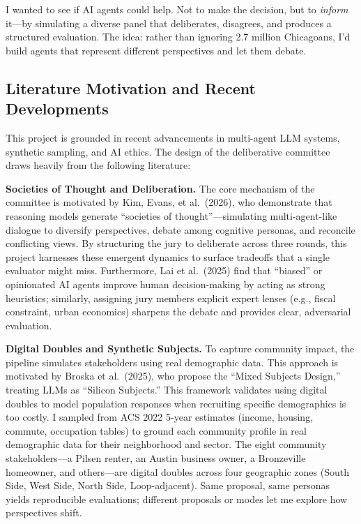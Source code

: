 \documentclass[
  11pt,
]{article}
\begin{document}
I wanted to see if AI agents could help. Not to make the decision, but
to \emph{inform} it---by simulating a diverse panel that deliberates,
disagrees, and produces a structured evaluation. The idea: rather than
ignoring 2.7 million Chicagoans, I'd build agents that represent
different perspectives and let them debate.

\subsection{Literature Motivation and Recent
Developments}\label{literature-motivation-and-recent-developments}

This project is grounded in recent advancements in multi-agent LLM
systems, synthetic sampling, and AI ethics. The design of the
deliberative committee draws heavily from the following literature:

\textbf{Societies of Thought and Deliberation.} The core mechanism of
the committee is motivated by Kim, Evans, et al.~(2026), who demonstrate
that reasoning models generate ``societies of thought''---simulating
multi-agent-like dialogue to diversify perspectives, debate among
cognitive personas, and reconcile conflicting views. By structuring the
jury to deliberate across three rounds, this project harnesses these
emergent dynamics to surface tradeoffs that a single evaluator might
miss. Furthermore, Lai et al.~(2025) find that ``biased'' or opinionated
AI agents improve human decision-making by acting as strong heuristics;
similarly, assigning jury members explicit expert lenses (e.g., fiscal
constraint, urban economics) sharpens the debate and provides clear,
adversarial evaluation.

\textbf{Digital Doubles and Synthetic Subjects.} To capture community
impact, the pipeline simulates stakeholders using real demographic data.
This approach is motivated by Broska et al.~(2025), who propose the
``Mixed Subjects Design,'' treating LLMs as ``Silicon Subjects.'' This
framework validates using digital doubles to model population responses
when recruiting specific demographics is too costly. I sampled from ACS
2022 5-year estimates (income, housing, commute, occupation tables) to
ground each community profile in real demographic data for their
neighborhood and sector. The eight community stakeholders---a Pilsen
renter, an Austin business owner, a Bronzeville homeowner, and
others---are digital doubles across four geographic zones (South Side,
West Side, North Side, Loop-adjacent). Same proposal, same personas
yields reproducible evaluations; different proposals or modes let me
explore how perspectives shift.
\end{document}
